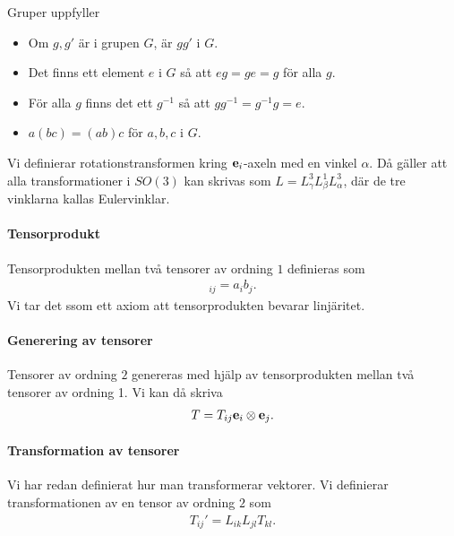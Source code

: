 Gruper uppfyller
\begin{itemize}
	\item Om $g, g'$ är i grupen $G$, är $gg'$ i $G$.
	\item Det finns ett element $e$ i $G$ så att $eg = ge = g$ för alla $g$.
	\item För alla $g$ finns det ett $g^{-1}$ så att $gg^{-1} = g^{-1}g = e$.
	\item $a(bc) = (ab)c$ för $a, b, c$ i $G$.
\end{itemize}

Vi definierar rotationstransformen kring $\vb{e}_{i}$-axeln med en vinkel $\alpha$. Då gäller att alla transformationer i $SO(3)$ kan skrivas som $L = L_{\gamma}^{3}L_{\beta}^{1}L_{\alpha}^{3}$, där de tre vinklarna kallas Eulervinklar.

\paragraph{Tensorprodukt}
Tensorprodukten mellan två tensorer av ordning $1$ definieras som
\begin{align*}
	[\tenprod{\vb{a}}{\vb{b}}]_{ij} = a_ib_j.
\end{align*}
Vi tar det ssom ett axiom att tensorprodukten bevarar linjäritet.

\paragraph{Generering av tensorer}
Tensorer av ordning $2$ genereras med hjälp av tensorprodukten mellan två tensorer av ordning 1. Vi kan då skriva
\begin{align*}
	T = T_{ij}\vb{e}_i\otimes \vb{e}_j.
\end{align*}

\paragraph{Transformation av tensorer}
Vi har redan definierat hur man transformerar vektorer. Vi definierar transformationen av en tensor av ordning $2$ som
\begin{align*}
	T_{ij}' = L_{ik}L_{jl}T_{kl}.
\end{align*}